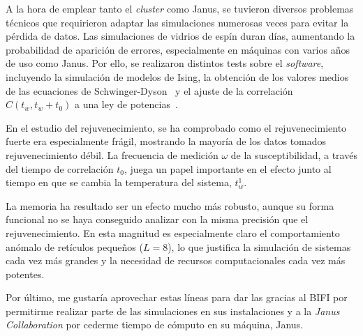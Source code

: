 \documentclass[11pt]{report}
\begin{document}
A la hora de emplear tanto el \textit{cluster} como Janus, se tuvieron
diversos problemas técnicos que requirieron adaptar las simulaciones
numerosas veces para evitar la pérdida de datos. Las simulaciones de
vidrios de espín duran días, aumentando la probabilidad de aparición
de errores, especialmente en máquinas con varios años de uso como
Janus. Por ello, se realizaron distintos tests sobre el
\textit{software}, incluyendo la simulación de modelos de Ising, la
obtención de los valores medios de las ecuaciones de
Schwinger-Dyson~\cite{schwinger} y el ajuste de la correlación
$C(t_w,t_w+t_0)$ a una ley de potencias~\cite{corrparisi}.

En el estudio del rejuvenecimiento, se ha comprobado como el
rejuvenecimiento fuerte era especialmente frágil, mostrando la mayoría
de los datos tomados rejuvenecimiento débil. La frecuencia de medición
$ω$ de la susceptibilidad, a través del tiempo de correlación $t_0$,
juega un papel importante en el efecto junto al tiempo en que se
cambia la temperatura del sistema, $t_w^1$.

La memoria ha resultado ser un efecto mucho más robusto, aunque su
forma funcional no se haya conseguido analizar con la misma precisión
que el rejuvenecimiento. En esta magnitud es especialmente claro el
comportamiento anómalo de retículos pequeños ($L=8$), lo que justifica
la simulación de sistemas cada vez más grandes y la necesidad de
recursos computacionales cada vez más potentes.

Por último, me gustaría aprovechar estas líneas para dar las gracias
al BIFI por permitirme realizar parte de las simulaciones en sus
instalaciones y a la \textit{Janus Collaboration} por cederme tiempo
de cómputo en su máquina, Janus.
\end{document}
